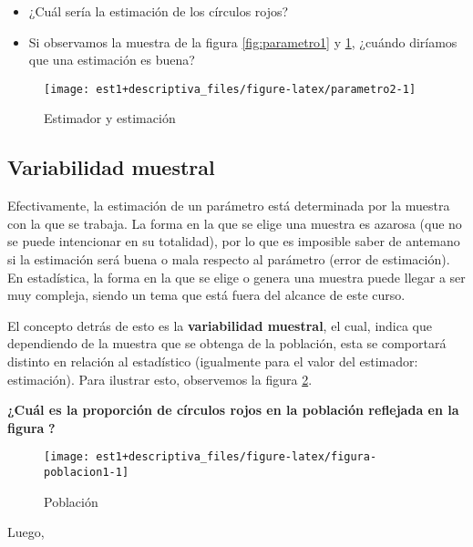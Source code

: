 \documentclass[
]{book}
\providecommand{\tightlist}{%
  \setlength{\itemsep}{0pt}\setlength{\parskip}{0pt}}
\begin{document}
\begin{itemize}
\tightlist
\item
  ¿Cuál sería la estimación de los círculos rojos?
\item
  Si observamos la muestra de la figura \ref{fig:parametro1} y \ref{fig:parametro2}, ¿cuándo diríamos que una estimación es buena?
\end{itemize}

\begin{figure}

{\centering \texttt{[image: est1+descriptiva\_files/figure-latex/parametro2-1]} 

}

\caption{Estimador y estimación}\label{fig:parametro2}
\end{figure}

\hypertarget{variabilidad-muestral}{%
\subsection{Variabilidad muestral}\label{variabilidad-muestral}}

Efectivamente, la estimación de un parámetro está determinada por la muestra con la que se trabaja. La forma en la que se elige una muestra es azarosa (que no se puede intencionar en su totalidad), por lo que es imposible saber de antemano si la estimación será buena o mala respecto al parámetro (error de estimación). En estadística, la forma en la que se elige o genera una muestra puede llegar a ser muy compleja, siendo un tema que está fuera del alcance de este curso.

El concepto detrás de esto es la \textbf{variabilidad muestral}, el cual, indica que dependiendo de la muestra que se obtenga de la población, esta se comportará distinto en relación al estadístico (igualmente para el valor del estimador: estimación). Para ilustrar esto, observemos la figura \ref{fig:figura-poblacion1}.

\textbf{¿Cuál es la proporción de círculos rojos en la población reflejada en la figura} \textbf{?}

\begin{figure}

{\centering \texttt{[image: est1+descriptiva\_files/figure-latex/figura-poblacion1-1]} 

}

\caption{Población}\label{fig:figura-poblacion1}
\end{figure}

Luego,
\end{document}
